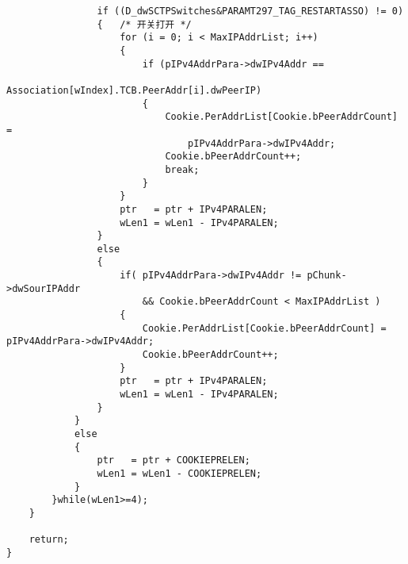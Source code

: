 ﻿\documentclass  [11pt,onecolumn]{article}
\begin{document}
\begin{lstlisting}
                if ((D_dwSCTPSwitches&PARAMT297_TAG_RESTARTASSO) != 0)
                {   /* 开关打开 */
                    for (i = 0; i < MaxIPAddrList; i++)
                    {
                        if (pIPv4AddrPara->dwIPv4Addr ==
                            Association[wIndex].TCB.PeerAddr[i].dwPeerIP)
                        {
                            Cookie.PerAddrList[Cookie.bPeerAddrCount] =
                                pIPv4AddrPara->dwIPv4Addr;
                            Cookie.bPeerAddrCount++;
                            break;
                        }
                    }
                    ptr   = ptr + IPv4PARALEN;
                    wLen1 = wLen1 - IPv4PARALEN;
                }
                else
                {
                    if( pIPv4AddrPara->dwIPv4Addr != pChunk->dwSourIPAddr
                        && Cookie.bPeerAddrCount < MaxIPAddrList )
                    {
                        Cookie.PerAddrList[Cookie.bPeerAddrCount] = pIPv4AddrPara->dwIPv4Addr;
                        Cookie.bPeerAddrCount++;
                    }
                    ptr   = ptr + IPv4PARALEN;
                    wLen1 = wLen1 - IPv4PARALEN;
                }
            }
            else
            {
                ptr   = ptr + COOKIEPRELEN;
                wLen1 = wLen1 - COOKIEPRELEN;
            }
        }while(wLen1>=4);
    }
     
    return;
}
\end{lstlisting}
\end{document}
